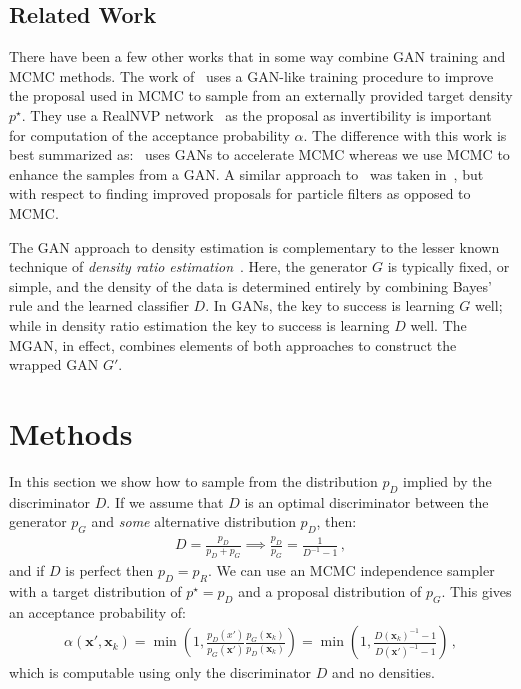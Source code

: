 \documentclass{article}
\renewcommand{\vec}[1]{{\boldsymbol{\mathbf{#1}}}} %
\newcommand{\target}{{p^\star}}
\newcommand{\PG}{{p_G}}
\newcommand{\PD}{{p_D}}
\newcommand{\PR}{{p_R}}
\newcommand{\accept}{\alpha}
\begin{document}

\subsection{Related Work}

There have been a few other works that in some way combine GAN training and MCMC methods.
The work of~\citet{Song2017} uses a GAN-like training procedure to improve the proposal used in MCMC to sample from an externally provided target density $\target$.
They use a RealNVP network~\citep{Dinh2016} as the proposal as invertibility is important for computation of the acceptance probability $\accept$.
The difference with this work is best summarized as:~\citet{Song2017} uses GANs to accelerate MCMC whereas we use MCMC to enhance the samples from a GAN\@.
A similar approach to~\citet{Song2017} was taken in~\citet{Kempinska2017}, but with respect to finding improved proposals for particle filters as opposed to MCMC\@.

The GAN approach to density estimation is complementary to the lesser known technique of \emph{density ratio estimation}~\citep{Sugiyama2012}.
Here, the generator $G$ is typically fixed, or simple, and the density of the data is determined entirely by combining Bayes' rule and the learned classifier $D$.
In GANs, the key to success is learning $G$ well; while in density ratio estimation the key to success is learning $D$ well.
The MGAN, in effect, combines elements of both approaches to construct the wrapped GAN $G'$.

\section{Methods}

In this section we show how to sample from the distribution $\PD$ implied by the discriminator $D$.
If we assume that $D$ is an optimal discriminator between the generator $\PG$ and \emph{some} alternative distribution $\PD$, then:
\begin{align}
  D = \frac{\PD}{\PD + \PG} \implies \frac{\PD}{\PG} = \frac{1}{D^{-1}-1}\,, \label{eq:PD def}
\end{align}
and if $D$ is perfect then $\PD = \PR$.
We can use an MCMC independence sampler with a target distribution of $\target=\PD$ and a proposal distribution of $\PG$.
This gives an acceptance probability of:
\begin{align}
  \accept(\vec x', \vec x_k)
    = \min\left(1, \frac{\PD(x')}{\PG(\vec x')} \frac{\PG(\vec x_k)}{\PD(\vec x_k)}\right)
    = \min\left(1, \frac{D(\vec x_k)^{-1} - 1}{D(\vec x')^{-1} - 1}\right)\,, \label{eq:alpha from D}
\end{align}
which is computable using only the discriminator $D$ and no densities.
\end{document}
